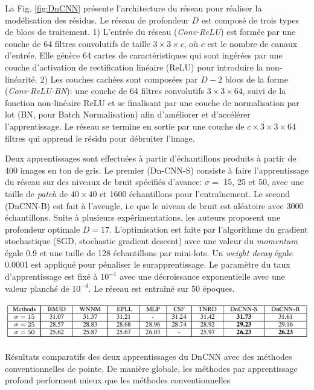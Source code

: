 La Fig. \ref{fig:DnCNN} présente l'architecture du réseau pour réaliser la modélisation des résidus. Le réseau de profondeur $D$ est composé de trois types de blocs de traitement. 1) L'entrée du réseau (\textit{Conv-ReLU}) est formée par une couche de 64 filtres convolutifs de taille $3 \times 3 \times c$, où $c$ est le nombre de canaux d'entrée. Elle génère 64 cartes de caractéristiques qui sont ingérées par une couche d'activation de rectification linéaire (ReLU) pour introduire la non-linéarité. 2) Les couches cachées sont composées par $D-2$ blocs de la forme (\textit{Conv-ReLU-BN}): une couche de 64 filtres convolutifs $3 \times 3 \times 64$, suivi de la fonction non-linéaire ReLU et se finalisant par une couche de normalisation par lot (BN, pour Batch Normalisation) afin d'améliorer et d'accélérer l'apprentissage. Le réseau se termine en sortie par une  couche de $c \times 3 \times 3 \times 64$ filtres qui apprend le résidu pour débruiter l'image.

Deux apprentissages sont effectuées à partir d'échantillons produits à partir de 400 images en ton de gris.  Le premier (Dn-CNN-S) consiste à faire l'apprentissage du réseau sur des niveaux de bruit spécifiés d'avance: $\sigma = $ 15, 25 et 50,  avec une taille de \textit{patch} de $40 \times 40$ et 1600 échantillons pour l'entraînement. Le second (DnCNN-B) est fait à l'aveugle, i.e que le niveau de bruit est aléatoire avec 3000 échantillons. Suite à plusieurs expérimentations, les auteurs proposent une profondeur optimale $D=17$. L'optimisation est faite par l'algorithme du gradient stochastique (SGD, stochastic gradient descent) avec une valeur du \textit{momentum} égale 0.9 et une taille de 128 échantillons par mini-lots. Un \textit{weight decay} égale 0.0001 est appliqué pour pénaliser le surapprentissage. Le paramètre du taux d'apprentissage est fixé à $10^{-1}$ avec une décroissance exponentielle avec une valeur planché de  $10^{-4}$. Le réseau est entraîné sur 50 époques.

\begin{table}
  \includegraphics[width=0.9\linewidth]{figures/geo6393/tab_dnCNN.png}
   \centering
  \caption{Résultats comparatifs des deux apprentissages du DnCNN avec des méthodes conventionnelles de pointe. De manière globale, les méthodes par apprentissage profond performent mieux que les méthodes conventionnelles}
  \label{tab:results_DnCNN}
\end{table}

